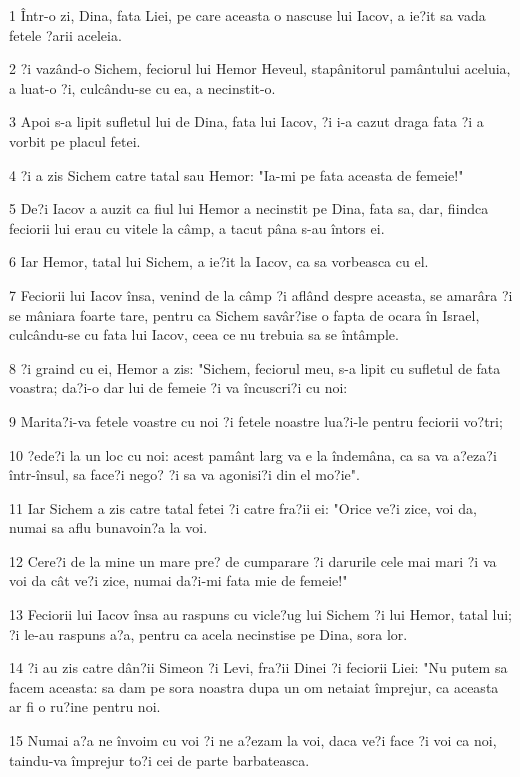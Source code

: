 \par 1 Într-o zi, Dina, fata Liei, pe care aceasta o nascuse lui Iacov, a ie?it sa vada fetele ?arii aceleia.
\par 2 ?i vazând-o Sichem, feciorul lui Hemor Heveul, stapânitorul pamântului aceluia, a luat-o ?i, culcându-se cu ea, a necinstit-o.
\par 3 Apoi s-a lipit sufletul lui de Dina, fata lui Iacov, ?i i-a cazut draga fata ?i a vorbit pe placul fetei.
\par 4 ?i a zis Sichem catre tatal sau Hemor: "Ia-mi pe fata aceasta de femeie!"
\par 5 De?i Iacov a auzit ca fiul lui Hemor a necinstit pe Dina, fata sa, dar, fiindca feciorii lui erau cu vitele la câmp, a tacut pâna s-au întors ei.
\par 6 Iar Hemor, tatal lui Sichem, a ie?it la Iacov, ca sa vorbeasca cu el.
\par 7 Feciorii lui Iacov însa, venind de la câmp ?i aflând despre aceasta, se amarâra ?i se mâniara foarte tare, pentru ca Sichem savâr?ise o fapta de ocara în Israel, culcându-se cu fata lui Iacov, ceea ce nu trebuia sa se întâmple.
\par 8 ?i graind cu ei, Hemor a zis: "Sichem, feciorul meu, s-a lipit cu sufletul de fata voastra; da?i-o dar lui de femeie ?i va încuscri?i cu noi:
\par 9 Marita?i-va fetele voastre cu noi ?i fetele noastre lua?i-le pentru feciorii vo?tri;
\par 10 ?ede?i la un loc cu noi: acest pamânt larg va e la îndemâna, ca sa va a?eza?i într-însul, sa face?i nego? ?i sa va agonisi?i din el mo?ie".
\par 11 Iar Sichem a zis catre tatal fetei ?i catre fra?ii ei: "Orice ve?i zice, voi da, numai sa aflu bunavoin?a la voi.
\par 12 Cere?i de la mine un mare pre? de cumparare ?i darurile cele mai mari ?i va voi da cât ve?i zice, numai da?i-mi fata mie de femeie!"
\par 13 Feciorii lui Iacov însa au raspuns cu vicle?ug lui Sichem ?i lui Hemor, tatal lui; ?i le-au raspuns a?a, pentru ca acela necinstise pe Dina, sora lor.
\par 14 ?i au zis catre dân?ii Simeon ?i Levi, fra?ii Dinei ?i feciorii Liei: "Nu putem sa facem aceasta: sa dam pe sora noastra dupa un om netaiat împrejur, ca aceasta ar fi o ru?ine pentru noi.
\par 15 Numai a?a ne învoim cu voi ?i ne a?ezam la voi, daca ve?i face ?i voi ca noi, taindu-va împrejur to?i cei de parte barbateasca.
